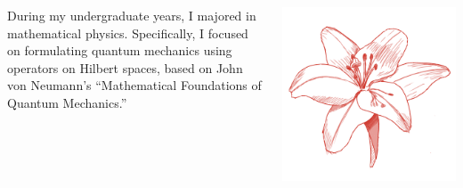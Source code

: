 \documentclass[dvipdfmx,11pt,notheorems]{beamer}
\begin{document}
\begin{frame}
  \begin{columns}[c]
    \begin{column}{0.6\textwidth}
      During my undergraduate years, I majored in mathematical physics. Specifically, I focused on formulating quantum mechanics using operators on Hilbert spaces, based on John von Neumann's ``Mathematical Foundations of Quantum Mechanics.''
    \end{column}
    \begin{column}{0.4\textwidth}
      \begin{center}
        \includegraphics[width=0.8\columnwidth]{global_okmtyuta.png}
      \end{center}
    \end{column}
  \end{columns}
\end{frame}

\end{document}
